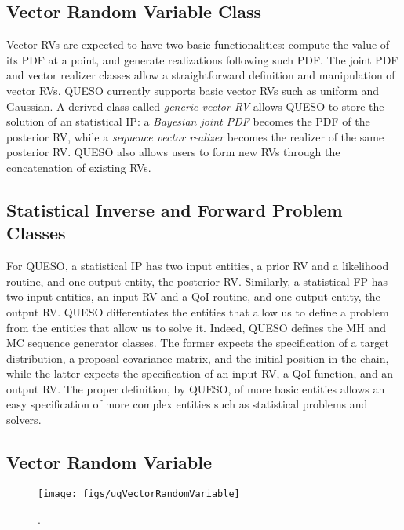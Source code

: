 \subsection{Vector Random Variable Class}
%
Vector RVs are expected to have two basic functionalities:
compute the value of its PDF at a point, and generate realizations following such PDF.
The joint PDF and vector realizer classes allow a straightforward definition and manipulation of vector RVs.
QUESO currently supports basic vector RVs such as uniform and Gaussian.
A derived class called {\it generic vector RV} allows QUESO to store the solution of an statistical IP:
a {\it Bayesian joint PDF} becomes the PDF of the posterior RV, while a {\it sequence vector realizer} becomes the realizer of the same posterior RV.
QUESO also allows users to form new RVs through the concatenation of existing RVs.



\subsection{Statistical Inverse and Forward Problem Classes}
%
For QUESO, a statistical IP has two input entities, a prior RV and a likelihood routine, and one output entity, the posterior RV.
Similarly, a statistical FP has two input entities, an input RV and a QoI routine, and one output entity, the output RV.
QUESO differentiates the entities that allow us to define a problem from the entities that allow us to solve it.
Indeed, QUESO defines the MH and MC sequence generator classes.
The former expects the specification of a target distribution, a proposal covariance matrix, and the initial position in the chain,
while the latter expects the specification of an input RV, a QoI function, and an output RV.
The proper definition, by QUESO, of more basic entities allows an easy specification of more complex entities such as statistical problems and solvers.


\subsection{Vector Random Variable}

\begin{figure}[h!]
\centerline{
\texttt{[image: figs/uqVectorRandomVariable]}
}
\caption{
{\color{red}{The class diagram for the vector random variable class}}.
}
\label{fig-vector-rv-class}
\end{figure}

